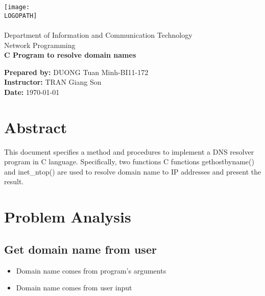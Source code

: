 \documentclass[12pt]{article}
\def \LOGOPATH {assets/logo-usth.png}
\def \DEPARTEMENT {Department of Information and Communication Technology}
\def \COURSENAME {Network Programming}
\def \REPORTTITLE {C Program to resolve domain names}
\def \STUDENTNAME {DUONG Tuan Minh}
\def \STUDENTID {BI11-172}
\def \INSTRUCTOR {TRAN Giang Son}
\begin{document}

\begin{titlepage}
    \vfill
    \begin{center}
        \texttt{[image: \\LOGOPATH]} \\
        \hfill \\
        \Large{\DEPARTEMENT} \\
        \Large{\COURSENAME} \\
        \vfill
        \textbf{\LARGE{\REPORTTITLE}}
    \end{center}
    \vfill
    \begin{flushleft}
        \Large{\textbf{Prepared by:} \STUDENTNAME\;-\;\STUDENTID} \\
        \Large{\textbf{Instructor:} \INSTRUCTOR} \\
        \Large{\textbf{Date:} \today}
    \end{flushleft}
    \vfill
\end{titlepage}

{
\section*{\centering Abstract} 
This document specifies a method and procedures to implement a DNS resolver program in C language. Specifically, two functions C functions gethostbyname() and inet\_ntop() are used to resolve domain name to IP addresses and present the result.
\clearpage
}


\tableofcontents
\clearpage

\setlength{\parskip}{\baselineskip}%



\section{Problem Analysis}

\subsection{Get domain name from user}
\begin{itemize}
    \item Domain name comes from program's arguments
    \item Domain name comes from user input
\end{itemize}
\end{document}
